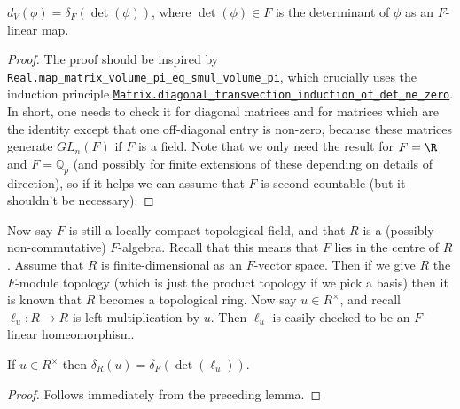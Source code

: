 \begin{lemma}
  \label{MeasureTheory.addEquivAddHaarChar_eq_ringHaarChar_det}
  \leanok
  $d_V(\phi)=\delta_F(\det(\phi))$, where $\det(\phi)\in F$ is the determinant of $\phi$ as an $F$-linear map.
\end{lemma}
\begin{proof}
The proof should be inspired by \href{https://leanprover-community.github.io/mathlib4\_docs/Mathlib/MeasureTheory/Measure/Lebesgue/Basic.html\#Real.map\_matrix\_volume\_pi\_eq\_smul\_volume\_pi}{\tt Real.map\_matrix\_volume\_pi\_eq\_smul\_volume\_pi},
which crucially uses the induction principle \href{https://leanprover-community.github.io/mathlib4\_docs/Mathlib/LinearAlgebra/Matrix/Transvection.html\#Matrix.diagonal\_transvection\_induction\_of\_det\_ne\_zero}{\tt Matrix.diagonal\_transvection\_induction\_of\_det\_ne\_zero}.
In short, one needs to check it for diagonal matrices and for matrices which are the identity
except that one off-diagonal entry is non-zero, because these matrices generate $GL_n(F)$
if $F$ is a field. Note that we only need the result for $F=\R$
and $F=\mathbb{Q}_p$ (and possibly for finite extensions of these depending on
details of direction), so if it helps we can assume that $F$ is second countable
(but it shouldn't be necessary).
\end{proof}

Now say $F$ is still a locally compact topological field, and that $R$ is a (possibly
non-commutative) $F$-algebra. Recall that this means that $F$ lies in the centre of $R$.
Assume that $R$ is finite-dimensional as an $F$-vector space. Then if we give $R$ the
$F$-module topology (which is just the product topology if we pick a basis) then it is known
that $R$ becomes a topological ring. Now say $u\in R^\times$, and
recall $\ell_u:R\to R$ is left multiplication by $u$. Then $\ell_u$ is easily checked to be
an $F$-linear homeomorphism.

  \begin{corollary}
  \label{MeasureTheory.ringAddHaarChar_eq_ringHaarChar_det}
  \leanok
  If $u\in R^\times$ then $\delta_R(u)=\delta_F(\det(\ell_u))$.
\end{corollary}
\begin{proof}
  \leanok
  Follows immediately from the preceding lemma.
\end{proof}


